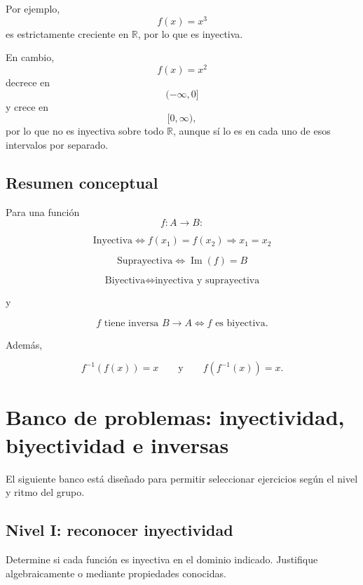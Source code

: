 \documentclass[12pt]{article}
\theoremstyle{remark}
\begin{document}
Por ejemplo,
\[
f(x)=x^3
\]
es estrictamente creciente en \(\mathbb{R}\), por lo que es inyectiva.

En cambio,
\[
f(x)=x^2
\]
decrece en
\[
(-\infty,0]
\]
y crece en
\[
[0,\infty),
\]
por lo que no es inyectiva sobre todo \(\mathbb{R}\), aunque sí lo es
en cada uno de esos intervalos por separado.

\subsection{Resumen conceptual}

Para una función
\[
f:A\longrightarrow B:
\]

\[
\boxed{
\text{Inyectiva}
\iff
f(x_1)=f(x_2)\Rightarrow x_1=x_2
}
\]

\[
\boxed{
\text{Suprayectiva}
\iff
\operatorname{Im}(f)=B
}
\]

\[
\boxed{
\text{Biyectiva}
\iff
\text{inyectiva y suprayectiva}
}
\]

y

\[
\boxed{
f\text{ tiene inversa }B\to A
\iff
f\text{ es biyectiva}.
}
\]

Además,

\[
\boxed{
f^{-1}(f(x))=x
}
\qquad\text{y}\qquad
\boxed{
f(f^{-1}(x))=x.
}
\]

\section{Banco de problemas: inyectividad, biyectividad e inversas}

El siguiente banco está diseñado para permitir seleccionar ejercicios
según el nivel y ritmo del grupo.

\subsection{Nivel I: reconocer inyectividad}

Determine si cada función es inyectiva en el dominio indicado.
Justifique algebraicamente o mediante propiedades conocidas.
\end{document}
